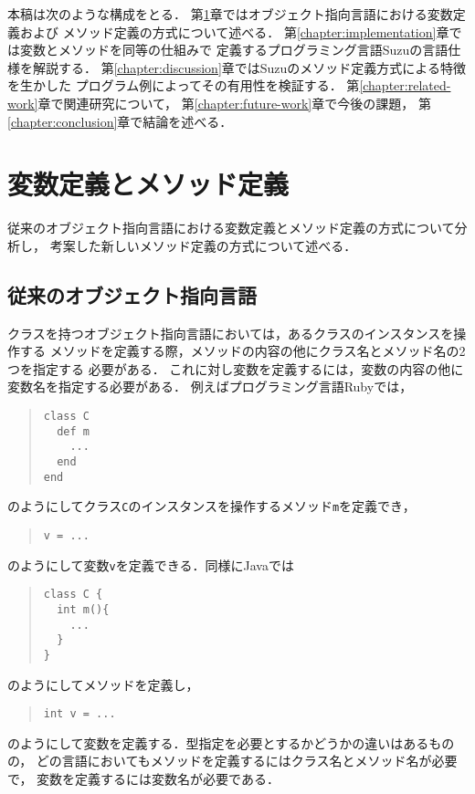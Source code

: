 \documentclass[a4paper,11pt,dvipdfmx]{jreport}
\begin{document}
本稿は次のような構成をとる．
第\ref{chapter:background}章ではオブジェクト指向言語における変数定義および
メソッド定義の方式について述べる．
第\ref{chapter:implementation}章では変数とメソッドを同等の仕組みで
定義するプログラミング言語Suzuの言語仕様を解説する．
第\ref{chapter:discussion}章ではSuzuのメソッド定義方式による特徴を生かした
プログラム例によってその有用性を検証する．
第\ref{chapter:related-work}章で関連研究について，
第\ref{chapter:future-work}章で今後の課題，
第\ref{chapter:conclusion}章で結論を述べる．


\chapter{変数定義とメソッド定義}
\label{chapter:background}

従来のオブジェクト指向言語における変数定義とメソッド定義の方式について分析し，
考案した新しいメソッド定義の方式について述べる．

\section{従来のオブジェクト指向言語}

クラスを持つオブジェクト指向言語においては，あるクラスのインスタンスを操作する
メソッドを定義する際，メソッドの内容の他にクラス名とメソッド名の2つを指定する
必要がある．
これに対し変数を定義するには，変数の内容の他に変数名を指定する必要がある．
例えばプログラミング言語Rubyでは，
\begin{quote}
\begin{verbatim}
class C
  def m
    ...
  end
end
\end{verbatim}
\end{quote}
のようにしてクラス\verb|C|のインスタンスを操作するメソッド\verb|m|を定義でき，
\begin{quote}
\begin{verbatim}
v = ...
\end{verbatim}
\end{quote}
のようにして変数\verb|v|を定義できる．同様にJavaでは
\begin{quote}
\begin{verbatim}
class C {
  int m(){
    ...
  }
}
\end{verbatim}
\end{quote}
のようにしてメソッドを定義し，
\begin{quote}
\begin{verbatim}
int v = ...
\end{verbatim}
\end{quote}
のようにして変数を定義する．型指定を必要とするかどうかの違いはあるものの，
どの言語においてもメソッドを定義するにはクラス名とメソッド名が必要で，
変数を定義するには変数名が必要である．
\end{document}

